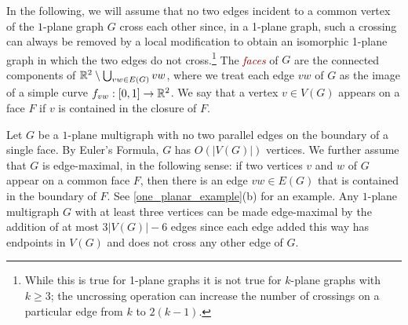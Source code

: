 \documentclass{patmorin}
\newcommand{\defin}[1]{\textcolor{Maroon}{\emph{#1}}}
\newcommand{\note}[2]{\noindent{\color{red}[#1:~#2]}}
\newcommand{\referee}[2]{\noindent\textcolor{blue}{\framebox{\begin{minipage}{\textwidth} Ref \#{#1}: #2\end{minipage}}}}
\DeclareMathOperator{\tw}{tw}
\renewcommand{\ge}{\geqslant}
\begin{document}
%
%
%

\note{PM}{I agree that we should fix it and keep it.  Another reason: For vertex ranking, the bound is $O(\log n/\log^{(t)} n)$ where $t:=\tw(H)$, so this is an example where $\tw(H)$ affects more than just the constant.}

In the following, we will assume that no two edges incident to a common vertex of the $1$-plane graph $G$ cross each other since, in a 1-plane graph, such a crossing can always be removed by a local modification to obtain an isomorphic 1-plane graph in which the two edges do not cross.\footnote{While this is true for 1-plane graphs it is not true for $k$-plane graphs with $k\ge 3$; the uncrossing operation can increase the number of crossings on a particular edge from $k$ to $2(k-1)$.}  The \defin{faces} of $G$ are the connected components of $\mathbb{R}^2\setminus \bigcup_{vw\in E(G)} vw$, where we treat each edge $vw$ of $G$ as the image of a simple curve $f_{vw}:[0,1]\to\mathbb{R}^2$.  We say that a vertex $v\in V(G)$ appears on a face $F$ if $v$ is contained in the closure of $F$.

Let $G$ be a $1$-plane multigraph with no two parallel edges on the boundary of a single face.  By Euler's Formula, $G$ has $O(|V(G)|)$ vertices.  We further assume that $G$ is edge-maximal, in the following sense:  if two vertices $v$ and $w$ of $G$ appear on a common face $F$, then there is an edge $vw\in E(G)$ that is contained in the boundary of $F$.  See  \cref{one_planar_example}(b) for an example.  Any $1$-plane multigraph $G$ with at least three vertices can be made edge-maximal by the addition of at most $3|V(G)|-6$ edges since each edge added this way has endpoints in $V(G)$ and does not cross any other edge of $G$.
\end{document}
